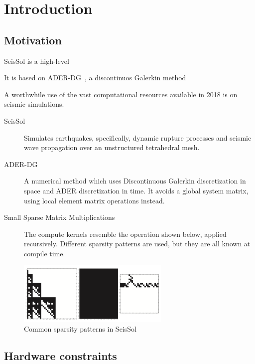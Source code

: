 \chapter{Introduction}
\label{chapter:Introduction}


\section{Motivation}

SeisSol is a high-level


It is based on ADER-DG~\cite{GJI:GJI3193}, a discontinuos Galerkin method 

A worthwhile use of the vast computational resources available in 2018 is on seismic simulations. 

\begin{description}
	\item[SeisSol]
    Simulates earthquakes, specifically, dynamic rupture processes and seismic wave propagation over an unstructured tetrahedral mesh. 

    \item[ADER-DG]
    A numerical method which uses Discontinuous Galerkin discretization in space and ADER discretization in time. It avoids a global system matrix, using local element matrix operations instead.

    \item[Small Sparse Matrix Multiplications]
    The compute kernels resemble the operation shown below, applied recursively. Different sparsity patterns are used, but they are all known at compile time.
\end{description}

\begin{figure}
  \centering
  \includegraphics[height=3cm]{images/seissol_visc.png}
  \caption{Common sparsity patterns in SeisSol}
  \label{fig:seissol_star}
\end{figure}

\section{Hardware constraints}
\label{section:knl}

